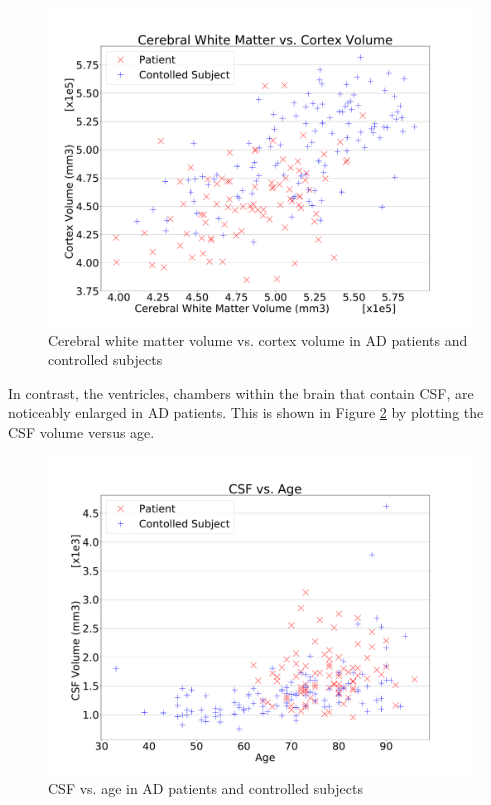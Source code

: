 \begin{figure}
	\centering
	\includegraphics[width=\columnwidth]{images/AD-CWMVolCortexVol.pdf}
	\caption{Cerebral white matter volume vs. cortex volume in AD patients and controlled subjects}
	\label{fig:AD-Age-CortexVol-WhiteMatter}
\end{figure}

In contrast, the ventricles, chambers within the brain that contain CSF, are noticeably enlarged in AD patients. This is shown in Figure \ref{fig:AD-Age-CSF.pdf} by plotting the CSF volume versus age.  

\begin{figure}
	\centering
	\includegraphics[width=\columnwidth]{images/AD-Age-CSF.pdf}
	\caption{CSF vs. age in AD patients and controlled subjects}
	\label{fig:AD-Age-CSF.pdf}
\end{figure}




